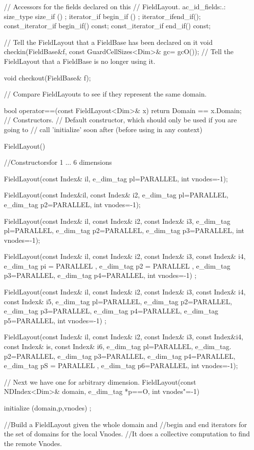 \begin{smallcode}
{// Accessors for the fields declared on this 
// FieldLayout. ac_id_fields:.: size_type size_if () ; 
iterator_if begin_if () ; 
iterator_ifend_if(); 
const_iterator_if begin_if() const; 
const_iterator_if end_if() const; 

// Tell the FieldLayout that a FieldBase has been declared on it
void checkin(FieldBase&f, const GuardCellSizes<Dim>& gc= gcO()); 
// Tell the FieldLayout that a FieldBase is no longer using it. 

void checkout(FieldBase& f); 

// Compare FieldLayouts to see if they represent the same domain. 

bool operator==(const FieldLayout<Dim>& x) 
{ 
return Domain == x.Domain; 
}
// Constructors. 
// Default constructor, which should only be used if you are going to 
// call 'initialize' soon after (before using in any context) 

FieldLayout() { } 

//Constructorsfor 1 ... 6 dimensions 

FieldLayout(const Index& il, e_dim_tag pl=PARALLEL, int vnodes=-1); 

FieldLayout(const Index&il, const Index& i2, e_dim_tag pl=PARALLEL, 
			e_dim_tag p2=PARALLEL, int vnodes=-1); 

FieldLayout(const Index& il, const Index& i2, const Index& i3,
e_dim_tag pl=PARALLEL, e_dim_tag p2=PARALLEL, e_dim_tag p3=PARALLEL, int vnodes=-1); 

FieldLayout(const Index& il, const Index& i2, const Index& i3, 
const Index& i4, e_dim_tag pi = PARALLEL , e_dim_tag p2 = PARALLEL , e_dim_tag p3=PARALLEL, 
e_dim_tag p4=PARALLEL, int vnodes=-1) ; 

FieldLayout(const Index& il, const Index& i2, const Index& i3,
const Index& i4, const Index& i5, e_dim_tag pl=PARALLEL, e_dim_tag p2=PARALLEL, 
e_dim_tag p3=PARALLEL, e_dim_tag p4=PARALLEL, e_dim_tag p5=PARALLEL, int vnodes=-1) ; 

FieldLayout(const Index& il, const Index& i2, const Index& i3, 
const Index&i4, const Index& is, const Index& i6, e_dim_tag pl=PARALLEL, e_dim_tag. p2=PARALLEL, 
e_dim_tag p3=PARALLEL, e_dim_tag p4=PARALLEL, e_dim_tag pS = PARALLEL , 
e_dim_tag p6=PARALLEL, int vnodes=-1);

// Next we have one for arbitrary dimension. 
FieldLayout(const NDIndex<Dim>& domain, e_dim_tag *p==O, int vnodes"=-1)
{ initialize (domain,p,vnodes) ; 

//Build a FieldLayout given the whole domain and 
//begin and end iterators for the set of domains for the local Vnodes. 
//It does a collective computation to find the remote Vnodes. 

}}
\end{smallcode}
